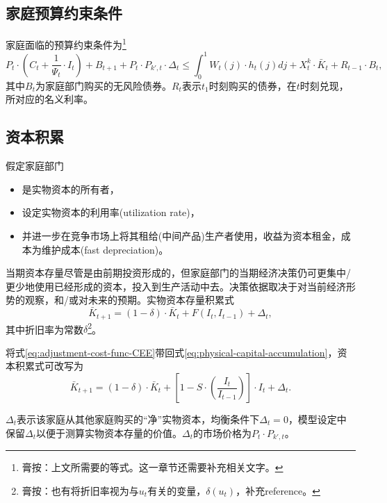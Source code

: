 \subsection{家庭预算约束条件}
\label{sec:HH-opt-prob-budget-constraint}
家庭面临的预算约束条件为\footnote{膏按：上文所需要的等式。这一章节还需要补充相关文字。}
\begin{equation}
\label{eq:HH-opt-prob-budget-constraint}
P_t \cdot \left(C_t + \frac{1}{\Psi_t} \cdot I_t \right) + B_{t+1} + P_t \cdot P_{k',t} \cdot \Delta_t \le \int_{0}^{1} W_{t}(j) \cdot h_{t}(j) dj + X^k_t \cdot \bar{K}_t
 + R_{t-1} \cdot B_t,
\end{equation}
其中$B_{t}$为家庭部门购买的无风险债券。$R_t$表示$t_1$时刻购买的债券，在$t$时刻兑现，所对应的名义利率。

\subsection{资本积累}
\label{capital-accumulation}
假定家庭部门
\begin{itemize}
\item 是实物资本的所有者，
\item 设定实物资本的利用率(utilization rate)，
\item 并进一步在竞争市场上将其租给(中间产品)生产者使用，收益为资本租金，成本为维护成本(fast depreciation)。
\end{itemize}

当期资本存量尽管是由前期投资形成的，但家庭部门的当期经济决策仍可更集中/更少地使用已经形成的资本，投入到生产活动中去。决策依据取决于对当前经济形势的观察，和/或对未来的预期。实物资本存量积累式
\begin{equation}
  \label{eq:physical-capital-accumulation}
  \bar{K}_{t+1} = (1-\delta) \cdot \bar{K}_t + F(I_t,I_{t-1}) + \Delta_t,
\end{equation}
其中折旧率为常数$\delta$\footnote{膏按：也有将折旧率视为与$u_t$有关的变量，$\delta(u_t)$，补充reference。}。

将式\eqref{eq:adjustment-cost-func-CEE}带回式\eqref{eq:physical-capital-accumulation}，资本积累式可改写为
\begin{equation}
\label{eq:phy-cap-accumu-cap-adj-cost}
\bar{K}_{t+1} = (1-\delta) \cdot \bar{K}_t + \left[ 1 - S \cdot \left(\frac{I_t}{I_{t-1}} \right) \right] \cdot I_t + \Delta_t.
\end{equation}

$\Delta_t$表示该家庭从其他家庭购买的“净”实物资本，均衡条件下$\Delta_t = 0$，模型设定中保留$\Delta_t$以便于测算实物资本存量的价值。$\Delta_t$的市场价格为$P_t \cdot P_{k',t}$。

